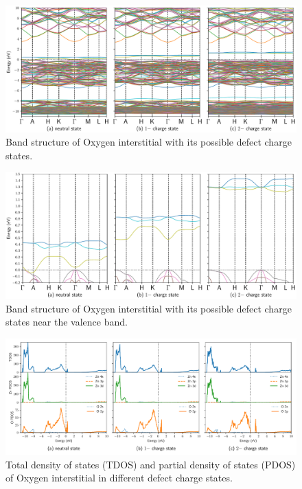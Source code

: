 \begin{figure}[tbph!]
	\centering
	\includegraphics[width=1\textwidth]{"images/rnd/O_i-band"}
	\caption[Band structure of Oxygen interstitial with its possible defect charge states]{Band structure of Oxygen interstitial with its possible defect charge states. }
	\label{fig:band-O_i}
\end{figure}

\begin{figure}[tbph!]
	\centering
	\includegraphics[width=1\textwidth]{"images/rnd/O_i-bandclose"}
	\caption[Band structure of Oxygen interstitial with its possible defect charge states near the valence band]{Band structure of Oxygen interstitial with its possible defect charge states near the valence band. }
	\label{fig:bandclose-O_i}
\end{figure}

\clearpage

\begin{figure}[t!]
	\centering
	\includegraphics[width=1\textwidth]{"images/rnd/O_i-dos"}
	\caption[Total density of states (TDOS) and partial density of states (PDOS) of Oxygen interstitial in different  defect charge states]{Total density of states (TDOS) and partial density of states (PDOS) of Oxygen interstitial in different  defect charge states.}
	\label{fig:dos-O_i}
\end{figure}


